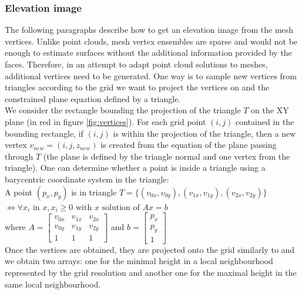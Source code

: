 \documentclass{kththesis}
\begin{document}
\subsubsection{Elevation image}
The following paragraphs describe how to get an elevation image from the mesh vertices. Unlike point clouds, mesh vertex ensembles are sparse and would not be enough to estimate surfaces without the additional information provided by the faces. Therefore, in an attempt to adapt point cloud solutions to meshes, additional vertices need to be generated. One way is to sample new vertices from triangles according to the grid we want to project the vertices on and the constrained plane equation defined by a triangle. \\
We consider the rectangle bounding the projection of the triangle $T$ on the XY plane (in red in figure \ref{fig:vertices}). For each grid point $(i,j)$ contained in the bounding rectangle, if $(i,j)$ is within the projection of the triangle, then a new vertex $v_{new}=(i,j, z_{new})$ is created from the equation of the plane passing through $T$ (the plane is defined by the triangle normal and one vertex from the triangle). One can determine whether a point is inside a triangle using a barycentric coordinate system in the triangle: \\ 
A point $(p_x, p_y)$ is in triangle $T= \{ (v_{0x},v_{0y} ), (v_{1x},v_{1y} ),(v_{2x},v_{2y} )\} $ \\
$\iff \forall x_i \text{ in } x, x_i \geq 0 \text{ with $x$ solution of } Ax=b$ \\
where $  A = \begin{bmatrix}
        v_{0x}  & v_{1x} & v_{2x}    \\
    v_{0y} & v_{1y} &   v_{2y} \\
    1  & 1 & 1
\end{bmatrix} $ and $b = \begin{bmatrix} p_x \\ p_y \\ 1 \end{bmatrix}$ \\

Once the vertices are obtained, they are projected onto the grid similarly to \parencite{det_seg_class} and we obtain two arrays: one for the minimal height in a local neighbourhood represented by the grid resolution and another one for the maximal height in the same local neighbourhood. 
\end{document}

